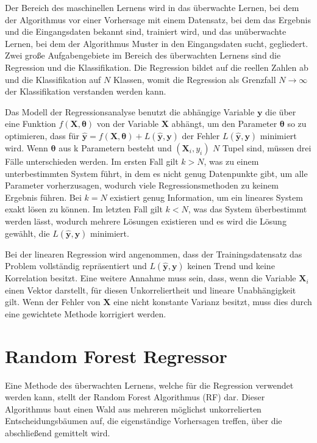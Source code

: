 Der Bereich des maschinellen Lernens wird in das überwachte Lernen, bei dem der Algorithmus vor einer Vorhersage mit einem Datensatz, bei dem das Ergebnis und die Eingangsdaten bekannt
sind, trainiert wird, und das unüberwachte Lernen, bei dem der Algorithmus Muster in den Eingangsdaten sucht, gegliedert.
Zwei große Aufgabengebiete im Bereich des überwachten Lernens sind die Regression und die Klassifikation. Die Regression bildet
auf die reellen Zahlen ab und die Klassifikation auf $N$ Klassen, womit die Regression als Grenzfall $N \to \infty$ der Klassifikation
verstanden werden kann.

Das Modell der Regressionsanalyse benutzt die abhängige Variable $\symbf{y}$ die über eine Funktion $f(\symbf{X},\symbf{\theta})$ von der Variable $\symbf{X}$ abhängt, um
den Parameter $\symbf{\theta}$ so zu optimieren, dass für $\symbf{\hat{y}} = f(\symbf{X},\symbf{\theta}) + L(\symbf{\hat{y}},\symbf{y})$ der Fehler
$L(\symbf{\hat{y}},\symbf{y})$ minimiert wird.
Wenn $\symbf{\theta}$ aus k Parametern besteht und $(\symbf{X}_i,y_i)$ $N$ Tupel sind, müssen drei Fälle unterschieden werden.
Im ersten Fall gilt $k>N$, was zu einem unterbestimmten System führt, in dem es nicht genug Datenpunkte gibt, um alle Parameter
vorherzusagen, wodurch viele Regressionsmethoden zu keinem Ergebnis führen.
Bei $k = N$ existiert genug Information, um ein lineares System exakt lösen zu können.
Im letzten Fall gilt $k<N$, was das System überbestimmt werden lässt, wodurch mehrere Lösungen existieren und
es wird die Lösung gewählt, die $L(\symbf{\hat{y}},\symbf{y})$ minimiert.

Bei der linearen Regression wird angenommen, dass der Trainingsdatensatz das Problem vollständig repräsentiert und $L(\symbf{\hat{y}},\symbf{y})$ keinen Trend
und keine Korrelation besitzt.
Eine weitere Annahme muss sein, dass, wenn die Variable $\symbf{X}_i$ einen Vektor darstellt, für diesen Unkorreliertheit und lineare Unabhängigkeit gilt.
Wenn der Fehler von $\symbf{X}$ eine nicht konstante Varianz besitzt, muss dies durch eine gewichtete Methode korrigiert werden.

\section{Random Forest Regressor}
\label{sec:RF}

Eine Methode des überwachten Lernens, welche für die Regression verwendet werden kann, stellt der Random Forest Algorithmus (RF) dar. Dieser Algorithmus baut
einen Wald aus mehreren möglichst unkorrelierten Entscheidungsbäumen auf, die eigenständige Vorhersagen treffen, über die abschließend gemittelt wird.

